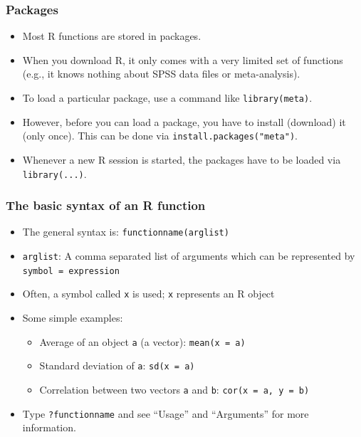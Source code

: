 \documentclass[bigger]{beamer}
\begin{document}
\begin{frame}[shrink=5]
\frametitle{Packages}
\label{sec-1-2-6}

\begin{itemize}
\item Most R functions are stored in packages.
\item When you download R, it only comes with a very limited set of functions
      (e.g., it knows nothing about SPSS data files or meta-analysis).
\item To load a particular package, use a command like \texttt{library(meta)}.
\item However, before you can load a package, you have to install (download)
      it (only once). This can be done via \texttt{install.packages("meta")}.
\item Whenever a new R session is started, the packages have to be loaded via
      \texttt{library(...)}.
\end{itemize}
\end{frame}
\begin{frame}
\frametitle{The basic syntax of an R function}
\label{sec-1-2-7}

\begin{itemize}
\item The general syntax is: \texttt{functionname(arglist)}
\item \texttt{arglist}: A comma separated list of arguments which can be represented by
      \\ \texttt{symbol = expression}
\item Often, a symbol called \texttt{x} is used; \texttt{x} represents an R object
\item Some simple examples:
\begin{itemize}
\item Average of an object \texttt{a} (a vector):  \texttt{mean(x = a)}
\item Standard deviation of \texttt{a}: \texttt{sd(x = a)}
\item Correlation between two vectors \texttt{a} and \texttt{b}: \texttt{cor(x = a, y = b)}
\end{itemize}
\item Type \texttt{?functionname} and see \enquote{Usage} and \enquote{Arguments} for more information.
\end{itemize}
\end{frame}
\end{document}
